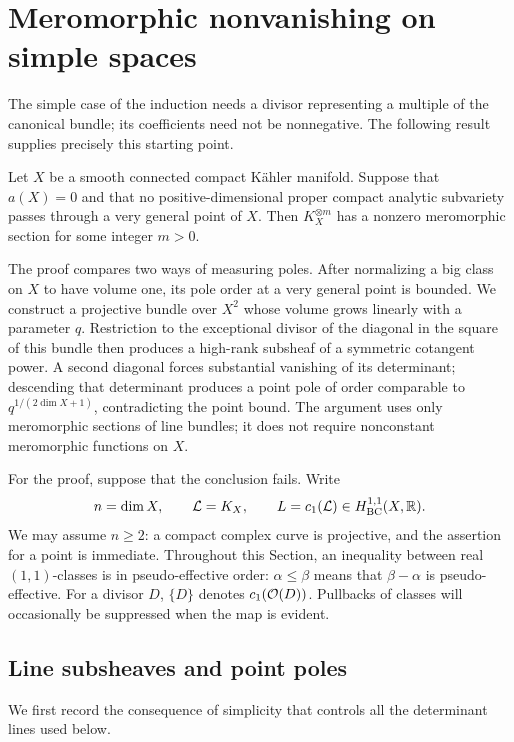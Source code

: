 \section{Meromorphic nonvanishing on simple spaces}\label{sec:nonvanishing}

The simple case of the induction needs a divisor representing a multiple of
the canonical bundle; its coefficients need not be nonnegative.  The
following result supplies precisely this starting point.

\begin{theorem}\label{nv:meromorphic}
Let \(X\) be a smooth connected compact Kähler manifold.  Suppose that
\(a(X)=0\) and that no positive-dimensional proper compact analytic
subvariety passes through a very general point of \(X\).  Then
\(K_X^{\otimes m}\) has a nonzero meromorphic section for some integer
\(m>0\).
\end{theorem}

The proof compares two ways of measuring poles.  After normalizing a big
class on \(X\) to have volume one, its pole order at a very general point is
bounded.  We construct a projective bundle over \(X^2\) whose volume grows
linearly with a parameter \(q\).  Restriction to the exceptional divisor of
the diagonal in the square of this bundle then produces a high-rank
subsheaf of a symmetric cotangent power.  A second diagonal forces
substantial vanishing of its determinant; descending that determinant
produces a point pole of order comparable to
\(q^{1/(2\dim X+1)}\), contradicting the point bound.
The argument uses only meromorphic sections of line bundles; it does not
require nonconstant meromorphic functions on \(X\).

For the proof, suppose that the conclusion fails.  Write
\[
 n=\dim X,\qquad \mathcal{L}=K_X,\qquad L=c_1(\mathcal{L})
       \in H^{1,1}_{\mathrm{BC}}(X,\mathbb R).
\]
We may assume \(n\ge2\): a compact complex curve is projective, and the
assertion for a point is immediate.  Throughout this Section, an inequality
between real \((1,1)\)-classes is in pseudo-effective order:
\(\alpha\le\beta\) means that \(\beta-\alpha\) is pseudo-effective.  For a
divisor \(D\), \(\{D\}\) denotes \(c_1(\mathcal O(D))\).  Pullbacks of classes will
occasionally be suppressed when the map is evident.

\subsection{Line subsheaves and point poles}

We first record the consequence of simplicity that controls all the
determinant lines used below.

